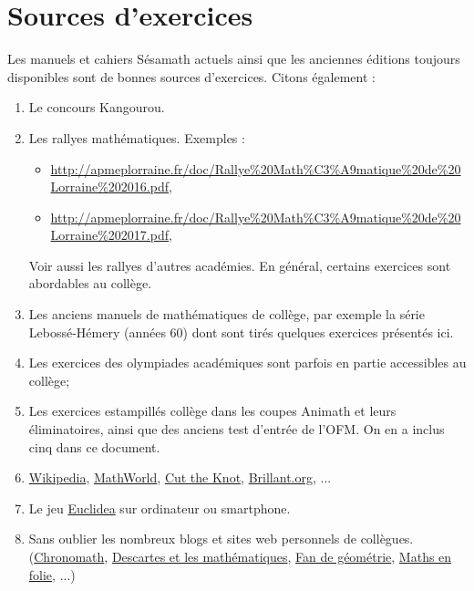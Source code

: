  

\section{Sources d'exercices}

Les manuels et cahiers Sésamath actuels ainsi que les anciennes éditions toujours disponibles sont de bonnes sources d'exercices. Citons également :

\begin{enumerate}
\item Le concours Kangourou.
\item Les rallyes mathématiques. Exemples : 
\begin{itemize}
\item \url{http://apmeplorraine.fr/doc/Rallye%20Math%C3%A9matique%20de%20Lorraine%202016.pdf}, 
\item \url{http://apmeplorraine.fr/doc/Rallye%20Math%C3%A9matique%20de%20Lorraine%202017.pdf},
\end{itemize}
Voir aussi les rallyes d'autres académies. En général, certains exercices sont abordables au collège.
\item Les anciens manuels de mathématiques de collège, par exemple la série Lebossé-Hémery (années 60) dont sont tirés quelques exercices présentés ici. 
\item Les exercices des olympiades académiques sont parfois en partie accessibles au collège;
\item Les exercices estampillés \og collège \fg{} dans les coupes Animath et leurs éliminatoires, ainsi que des anciens test d'entrée de l'OFM. On en a inclus cinq dans ce document.
\item \href{http://fr.wikipedia.org}{Wikipedia}, \href{http://mathworld.wolfram.com/}{MathWorld}, \href{https://www.cut-the-knot.org/}{Cut the Knot}, \href{https://www.brilliant.org}{Brillant.org}, ...
\item Le jeu \href{https://www.euclidea.xyz}{Euclidea} sur ordinateur ou smartphone.
\item Sans oublier les nombreux blogs et sites web personnels de collègues. (\href{http://serge.mehl.free.fr/base/index_concr1.html}{Chronomath}, \href{http://debart.pagesperso-orange.fr/}{Descartes et les mathématiques}, \href{http://fandegeometrie.blogspot.fr/}{Fan de géométrie}, \href{http://mathafou.free.fr/}{Maths en folie}, ...) 
\end{enumerate}


